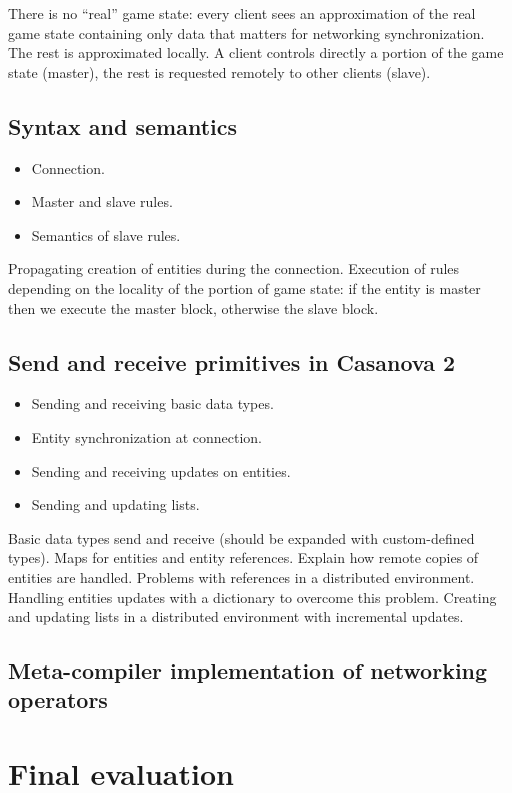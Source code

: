 \documentclass[8pt,a5paper]{extbook}
\begin{document}
	There is no ``real'' game state: every client sees an approximation of the real game state containing only data that matters for networking synchronization. The rest is approximated locally. A client controls directly a portion of the game state (master), the rest is requested remotely to other clients (slave).
\section{Syntax and semantics}
	\begin{itemize}[noitemsep]
		\item Connection.
		\item Master and slave rules.
		\item Semantics of slave rules.
	\end{itemize}
	
	Propagating creation of entities during the connection. Execution of rules depending on the locality of the portion of game state: if the entity is master then we execute the master block, otherwise the slave block.
\section{Send and receive primitives in Casanova 2}
	\begin{itemize}[noitemsep]
		\item Sending and receiving basic data types.
		\item Entity synchronization at connection.
		\item Sending and receiving updates on entities.
		\item Sending and updating lists.
	\end{itemize}
	
	Basic data types send and receive (should be expanded with custom-defined types). Maps for entities and entity references. Explain how remote copies of entities are handled. Problems with references in a distributed environment. Handling entities updates with a dictionary to overcome this problem. Creating and updating lists in a distributed environment with incremental updates.

\section{Meta-compiler implementation of networking operators}
	
\chapter{Final evaluation}
\end{document}
